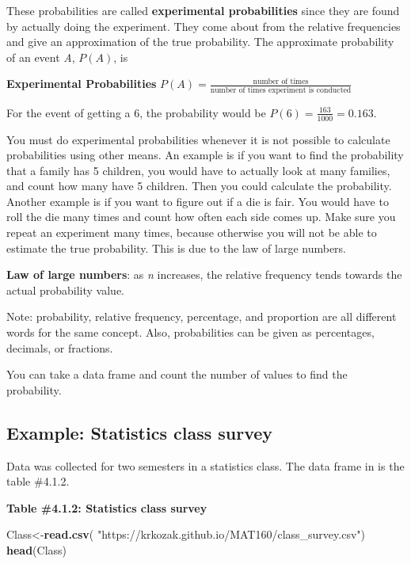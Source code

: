 \documentclass[
]{book}
\newenvironment{Shaded}{\begin{snugshade}}{\end{snugshade}}
\newcommand{\KeywordTok}[1]{\textcolor[rgb]{0.13,0.29,0.53}{\textbf{#1}}}
\newcommand{\NormalTok}[1]{#1}
\newcommand{\StringTok}[1]{\textcolor[rgb]{0.31,0.60,0.02}{#1}}
\begin{document}
These probabilities are called \textbf{experimental probabilities} since they
are found by actually doing the experiment. They come about from the
relative frequencies and give an approximation of the true probability.
The approximate probability of an event \emph{A}, \(P(A)\), is

\textbf{Experimental Probabilities}
\(P(A)=\frac{\text{number of times} }{ \text{number of times experiment is conducted}}\)

For the event of getting a 6, the probability would be \(P(6)=\frac{163}{1000}=0.163\).

You must do experimental probabilities whenever it is not possible to calculate probabilities using other means. An example is if you want to find the probability that a family has 5 children, you would have to
actually look at many families, and count how many have 5 children. Then you could calculate the probability. Another example is if you want to figure out if a die is fair. You would have to roll the die many times and count how often each side comes up. Make sure you repeat an experiment many times, because otherwise you will not be able to estimate the true probability. This is due to the law of large numbers.

\textbf{Law of large numbers}: as \emph{n} increases, the relative frequency tends towards the actual probability value.

Note: probability, relative frequency, percentage, and proportion are all different words for the same concept. Also, probabilities can be given as percentages, decimals, or fractions.

You can take a data frame and count the number of values to find the probability.

\hypertarget{example-statistics-class-survey}{%
\subsection{Example: Statistics class survey}\label{example-statistics-class-survey}}

Data was collected for two semesters in a statistics class. The data frame in is the table \#4.1.2.

\textbf{Table \#4.1.2: Statistics class survey}

\begin{Shaded}
\begin{Highlighting}[]
\NormalTok{Class<-}\KeywordTok{read.csv}\NormalTok{(}
  \StringTok{"https://krkozak.github.io/MAT160/class_survey.csv"}\NormalTok{)}
\KeywordTok{head}\NormalTok{(Class)}
\end{Highlighting}
\end{Shaded}
\end{document}
